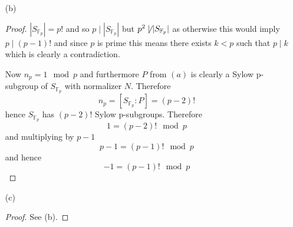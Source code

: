 \documentclass[12pt]{article}
\begin{document}
\begin{enumerate}
\begin{proof}
        Next we show that $P \lhd N$. Clearly $P \leq N$ as conjugating $P$
        by itself is an automorphism of $P$. Normality is clear as if $\sigma \in N$
        then $\sigma P \sigma^{-1} = P$ by definition.

        Now to characterize $N$ further, note that the characterization
        \[ N = \{ \sigma \in S_{\mathbb F_p}: \exists a \in \{ 1, \ldots, p-1 \} \text{ s.t. } \forall i \in \{ 0, \ldots, p-1\}, \sigma(i+1) - \sigma(i) = a \} \]
        gives a bijection of sets
        from $N$ to $\mathbb F_p \times \mathbb F_p^\times$ given by the map
        \[ f: \sigma_{b,a} \to (b, a) \]
        where $\sigma_{b, a}$ is the permutation given by $\sigma(x) = ax + b$.

        Now I claim that $N \cong \mathbb F_p \rtimes_\varphi \mathbb F_p^\times$ with
        multiplication in the semidirect product defined as
        \[ (b, a) \cdot (b', a') = (b + ab', aa') \]
        where $\varphi: \mathbb F_p^\times \to \operatorname{Aut}(\mathbb F_p)$ is
        the identity as the automorphisms of $\mathbb F_p$ are precisely multiplication
        by a non-zero element (if $\phi$ is an automorphism it corresponds to multiplication by $\phi(1)$).

        Now we need only show that the $f$ above is a homorphism as it is already clearly a bijection.
        First note that
        \[ \sigma_{b, a} \circ \sigma_{b', a'}(x) = \sigma_{b, a}(a'x + b') = (aa'x + ab' + b) = \sigma_{ab' + b, aa'}(x) \]
        Therefore
        \[ f(\sigma_{b, a}\circ\sigma_{b', a'}) = f(\sigma_{ab' + b, aa'}) = (ab' + b, aa') = (a, b)(a', b') = f(\sigma_{a, b})f(\sigma_{a', b'}) \]
        as required. Now clearly we can identify $P$ with the functions $x + b$ for $b \in \mathbb F_p$
        therefore $P \cong \mathbb F_p$. Hence
        \[ N/P \cong \mathbb F_p^\times \]
    \end{proof}

    \item[(b)]
    \begin{proof}
        $|S_{\mathbb F_p}| = p!$ and so $p \mid |S_{\mathbb F_p}|$ but
        $p^2 \not\mid |S_{\mathbb F_p}|$ as otherwise this would imply $p \mid (p-1)!$
        and since $p$ is prime this means there exists $k < p$ such that $p \mid k$ which is clearly a contradiction.

        Now $n_p = 1 \mod p$ and furthermore $P$ from $(a)$ is clearly a Sylow p-subgroup
        of $S_{\mathbb F_p}$ with normalizer $N$.
        Therefore
        \[ n_p = [S_{\mathbb F_p} : P] = (p-2)! \]
        hence $S_{\mathbb F_p}$ has $(p-2)!$ Sylow p-subgroups.
        Therefore
        \[ 1 = (p-2)! \mod p \]
        and multiplying by $p-1$
        \[ p-1 = (p-1)! \mod p \]
        and hence
        \[ -1 = (p-1)! \mod p \]
    \end{proof}

    \item[(c)]
    \begin{proof}
        See (b).
    \end{proof}
\end{enumerate}
\end{document}
